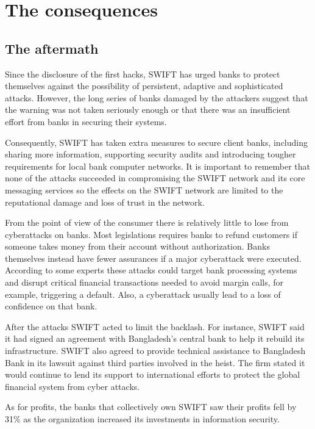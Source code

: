 \documentclass[12pt]{article}
\begin{document}
\section{The consequences}
        
        \subsection{The aftermath}
        Since the disclosure of the first hacks, SWIFT has urged banks to protect themselves against the possibility of persistent, adaptive and sophisticated attacks. However, the long series of banks damaged by the attackers suggest that the warning was not taken seriously enough or that there was an insufficient effort from banks in securing their systems. 
        
        Consequently, SWIFT has taken extra measures to secure client banks, including sharing more information, supporting security audits and introducing tougher requirements for local bank computer networks. It is important to remember that none of the attacks succeeded in compromising the SWIFT network and its core messaging services so the effects on the SWIFT network are limited to the reputational damage and loss of trust in the network.

        From the point of view of the consumer there is relatively little to lose from cyberattacks on banks. Most legislations requires banks to refund customers if someone takes money from their account without authorization. Banks themselves instead have fewer assurances if a major cyberattack were executed. According to some experts these attacks could target bank processing systems and disrupt critical financial transactions needed to avoid margin calls, for example, triggering a default. Also, a cyberattack usually lead to a loss of confidence on that bank. 
        
        After the attacks SWIFT acted to limit the backlash. For instance, SWIFT said it had signed an agreement with Bangladesh’s central bank to help it rebuild its infrastructure. SWIFT also agreed to provide technical assistance to Bangladesh Bank in its lawsuit against third parties involved in the heist. The firm stated it would continue to lend its support to international efforts to protect the global financial system from cyber attacks. 
        
        As for profits, the banks that collectively own SWIFT saw their profits fell by 31\% as the organization increased its investments in information security.\cite{SecurityInvestmentsConsume}
        
\end{document}
